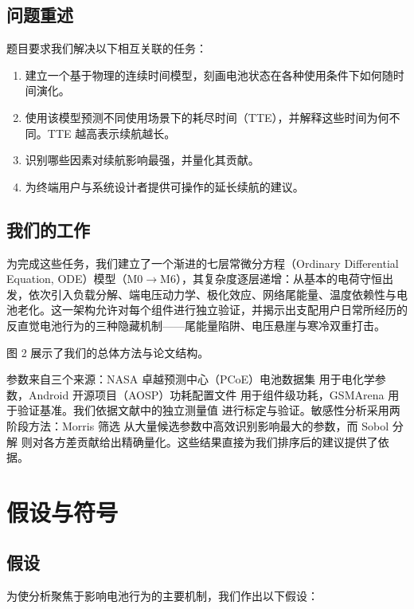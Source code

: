 \documentclass[11pt,a4paper]{ctexart}
\begin{document}
\subsection{问题重述}

题目要求我们解决以下相互关联的任务：

\begin{enumerate}[leftmargin=2em]
\item 建立一个基于物理的连续时间模型，刻画电池状态在各种使用条件下如何随时间演化。
\item 使用该模型预测不同使用场景下的耗尽时间（TTE），并解释这些时间为何不同。TTE 越高表示续航越长。
\item 识别哪些因素对续航影响最强，并量化其贡献。
\item 为终端用户与系统设计者提供可操作的延长续航的建议。
\end{enumerate}

\subsection{我们的工作}

为完成这些任务，我们建立了一个渐进的七层常微分方程（Ordinary Differential Equation, ODE）模型（M0$\to$M6），其复杂度逐层递增：从基本的电荷守恒出发，依次引入负载分解、端电压动力学、极化效应、网络尾能量、温度依赖性与电池老化。这一架构允许对每个组件进行独立验证，并揭示出支配用户日常所经历的反直觉电池行为的三种隐藏机制——尾能量陷阱、电压悬崖与寒冷双重打击。

图 2 展示了我们的总体方法与论文结构。

参数来自三个来源：NASA 卓越预测中心（PCoE）电池数据集 \cite{ref4} 用于电化学参数，Android 开源项目（AOSP）功耗配置文件 \cite{ref5} 用于组件级功耗，GSMArena \cite{ref6} 用于验证基准。我们依据文献中的独立测量值 \cite{ref7,ref2} 进行标定与验证。敏感性分析采用两阶段方法：Morris 筛选 \cite{ref8,ref9} 从大量候选参数中高效识别影响最大的参数，而 Sobol 分解 \cite{ref10,ref11} 则对各方差贡献给出精确量化。这些结果直接为我们排序后的建议提供了依据。

\section{假设与符号}

\subsection{假设}

为使分析聚焦于影响电池行为的主要机制，我们作出以下假设：
\end{document}
